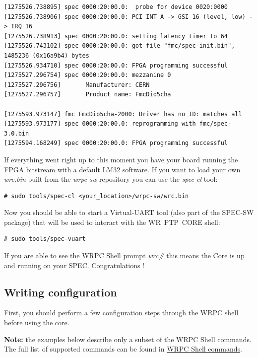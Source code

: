 \documentclass[a4paper, 12pt]{article}
\newcommand{\link}[1]{\hyperref[#1]{#1}}
\newcommand{\codeHook}[1]{\mbox{\ttfamily\MakeTextUppercase{#1}}}
\begin{document}
\begin{lstlisting}[basicstyle=\tiny]
[1275526.738895] spec 0000:20:00.0:  probe for device 0020:0000
[1275526.738906] spec 0000:20:00.0: PCI INT A -> GSI 16 (level, low) -> IRQ 16
[1275526.738913] spec 0000:20:00.0: setting latency timer to 64
[1275526.743102] spec 0000:20:00.0: got file "fmc/spec-init.bin", 1485236 (0x16a9b4) bytes
[1275526.934710] spec 0000:20:00.0: FPGA programming successful
[1275527.296754] spec 0000:20:00.0: mezzanine 0
[1275527.296756]       Manufacturer: CERN
[1275527.296757]       Product name: FmcDio5cha

[1275593.973147] fmc FmcDio5cha-2000: Driver has no ID: matches all
[1275593.973177] spec 0000:20:00.0: reprogramming with fmc/spec-3.0.bin
[1275594.168249] spec 0000:20:00.0: FPGA programming successful
\end{lstlisting}

If everything went right up to this moment you have your board running the FPGA 
bitstream with a default \codeHook{lm32} software. If you want to load your own
\textit{wrc.bin} built from the \textit{wrpc-sw} repository you can use the \textit{spec-cl}
tool:

\begin{lstlisting}
# sudo tools/spec-cl <your_location>/wrpc-sw/wrc.bin
\end{lstlisting}

\vspace{1em}
Now you should be able to start a Virtual-UART tool (also part of the
\codeHook{spec-sw} package) that will be used to interact with the \codeHook{wr ptp core}
shell:

\begin{lstlisting}
# sudo tools/spec-vuart
\end{lstlisting}

If you are able to see the \codeHook{wrpc} Shell prompt \textit{wrc\#} this means the Core
is up and running on your \codeHook{spec}. Congratulations !


\label{Writing configuration}
\subsection{Writing configuration}

First, you should perform a few configuration steps through the \codeHook{wrpc} shell
before using the core.

\textbf{Note:} the examples below describe only a subset of the \codeHook{wrpc} Shell
commands. The full list of supported commands can be found in
\link{WRPC Shell commands}.
\end{document}

